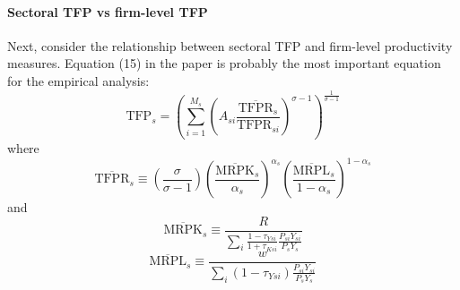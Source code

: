 \documentclass[12pt]{article}
\begin{document}
\paragraph{Sectoral TFP vs firm-level TFP \\ [6pt]}
		Next, consider the relationship between sectoral TFP and firm-level productivity measures. Equation (15) in the paper is probably the most important equation for the empirical analysis:
	\begin{equation}
		\text{TFP}_s = \left(\sum_{i=1}^{M_s} \left(A_{si} \frac{\overline{\text{TFPR}}_s}{\text{TFPR}_{si}}\right)^{\sigma -1}\right)^{\frac{1}{\sigma -1}}
	\end{equation}
	where
	\[\overline{\text{TFPR}}_s \equiv \left(\frac{\sigma}{\sigma -1}\right) \left(\frac{\overline{\text{MRPK}}_s}{\alpha_s}\right)^{\alpha_s}\left(\frac{\overline{\text{MRPL}}_s}{1-\alpha_s}\right)^{1-\alpha_s} \]
	and
	\[\overline{\text{MRPK}}_s \equiv \frac{R}{\sum_i \frac{1-\tau_{Ysi}}{1+\tau_{Ksi}} \frac{P_{si}Y_{si}}{P_s Y_s}}\]
	\[\overline{\text{MRPL}}_s \equiv \frac{w}{\sum_i (1-\tau_{Ysi}) \frac{P_{si}Y_{si}}{P_s Y_s}}\]
	
\end{document}
